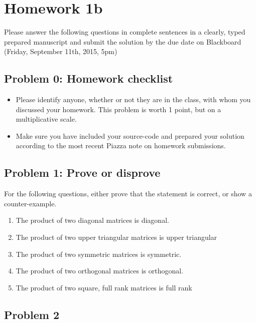 \documentclass{article}
\begin{document}
 
\hypertarget{homework_1b_1}{}\section*{{Homework 1b}}\label{homework_1b_1}

Please answer the following questions in complete sentences in a clearly, typed prepared manuscript and submit the solution by the due date on Blackboard (Friday, September 11th, 2015, 5pm)

\hypertarget{problem_0_homework_checklist_2}{}\subsection*{{Problem 0: Homework checklist}}\label{problem_0_homework_checklist_2}

\begin{itemize}%
\item Please identify anyone, whether or not they are in the class, with whom you discussed your homework. This problem is worth 1 point, but on a multiplicative scale.


\item Make sure you have included your source-code and prepared your solution according to the most recent Piazza note on homework submissions.



\end{itemize}
\hypertarget{problem_1_prove_or_disprove_3}{}\subsection*{{Problem 1: Prove or disprove}}\label{problem_1_prove_or_disprove_3}

For the following questions, either prove that the statement is correct, or show a counter-example.

\begin{enumerate}%
\item The product of two diagonal matrices is diagonal.


\item The product of two upper triangular matrices is upper triangular


\item The product of two symmetric matrices is symmetric.


\item The product of two orthogonal matrices is orthogonal.


\item The product of two square, full rank matrices is full rank



\end{enumerate}
\hypertarget{problem_2_4}{}\subsection*{{Problem 2}}\label{problem_2_4}
\end{document}
